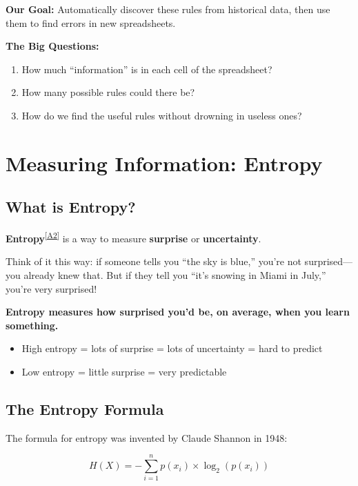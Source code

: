\documentclass[11pt,a4paper]{article}
\newcommand{\term}[2]{\textcolor{termcolor}{\textbf{#1}}\textsuperscript{\hyperref[#2]{[#2]}}}
\begin{document}
\textbf{Our Goal:} Automatically discover these rules from historical data, then use them to find errors in new spreadsheets.

\textbf{The Big Questions:}
\begin{enumerate}
    \item How much ``information'' is in each cell of the spreadsheet?
    \item How many possible rules could there be?
    \item How do we find the useful rules without drowning in useless ones?
\end{enumerate}

\section{Measuring Information: Entropy}

\subsection{What is Entropy?}

\term{Entropy}{A2} is a way to measure \textbf{surprise} or \textbf{uncertainty}. 

Think of it this way: if someone tells you ``the sky is blue,'' you're not surprised---you already knew that. But if they tell you ``it's snowing in Miami in July,'' you're very surprised!

\begin{keyidea}
\textbf{Entropy measures how surprised you'd be, on average, when you learn something.}

\begin{itemize}
    \item High entropy = lots of surprise = lots of uncertainty = hard to predict
    \item Low entropy = little surprise = very predictable
\end{itemize}
\end{keyidea}

\subsection{The Entropy Formula}

The formula for entropy was invented by Claude Shannon in 1948:

\begin{equation}
H(X) = -\sum_{i=1}^{n} p(x_i) \times \log_2(p(x_i))
\label{eq:entropy}
\end{equation}
\end{document}
